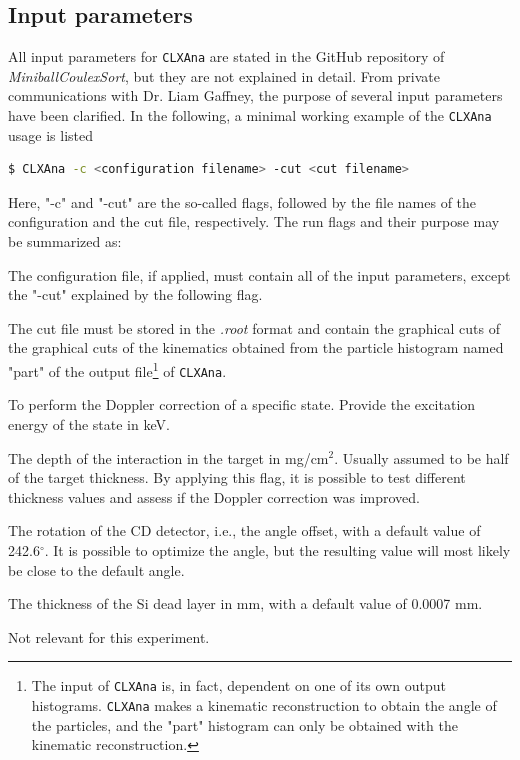 \documentclass[twoside,english]{uiofysmaster/uiofysmaster}
\begin{document}
\begin{appendices}
\subsection{Input parameters}
All input parameters for \texttt{CLXAna} are stated in the GitHub repository of \textsl{MiniballCoulexSort}, but they are not explained in detail. 
From private communications with Dr. Liam Gaffney, the purpose of several input parameters have been clarified. 
In the following, a minimal working example of the \texttt{CLXAna} usage is listed
\begin{lstlisting}[language=sh]
$ CLXAna -c <configuration filename> -cut <cut filename>
\end{lstlisting}
Here, "-c" and "-cut" are the so-called flags, followed by the file names of the configuration and the cut file, respectively. 
The run flags and their purpose may be summarized as:
\begin{description}[align=left]
	\item [-c] The configuration file, if applied, must contain all of the input parameters, except the "-cut" explained by the following flag.
	\item [-cut] The cut file must be stored in the \textit{.root} format and contain the graphical cuts of the
	graphical cuts of the kinematics obtained from the particle histogram named "part" of the output file\footnote{The input of \texttt{CLXAna} is, in fact, dependent on one of its own output histograms. 
	\texttt{CLXAna} makes a kinematic reconstruction to obtain the angle of the particles, and the "part" histogram can only be obtained with the kinematic reconstruction.} of \texttt{CLXAna}.	 
	\item [-Ex] To perform the Doppler correction of a specific state. 
	Provide the excitation energy of the state in keV.
	\item [-depth] The depth of the interaction in the target in mg/cm$^2$. 
	Usually assumed to be half of the target thickness. 
	By applying this flag, it is possible to test different thickness values and assess if the Doppler correction was improved. 
	\item [-cdoffset] The rotation of the CD detector, i.e., the angle offset, with a default value of 242.6$^\circ$. 
	It is possible to optimize the angle, but the resulting value will most likely be close to the default angle. 
	\item [-deadlayer] The thickness of the Si dead layer in mm, with a default value of 0.0007 mm.
	\item [-spededist] Not relevant for this experiment.

\end{description}
\end{appendices}
\end{document}
